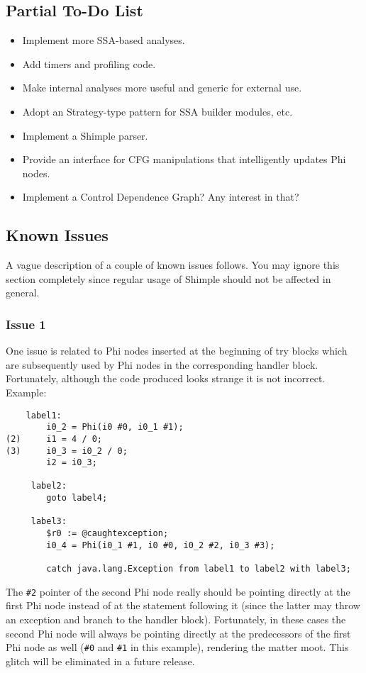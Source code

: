 \documentclass[10pt,letterpaper,oneside,onecolumn]{article}
\begin{document}
\subsection{Partial To-Do List}

\begin{itemize}
\item Implement more SSA-based analyses.
\item Add timers and profiling code.
\item Make internal analyses more useful and generic for external use.
\item Adopt an Strategy-type pattern for SSA builder modules, etc.
\item Implement a Shimple parser.
\item Provide an interface for CFG manipulations that intelligently 
updates Phi nodes.
\item Implement a Control Dependence Graph?  Any interest in that?
\end{itemize}

\subsection{Known Issues}

A vague description of a couple of known issues follows.  You may
ignore this section completely since regular usage of Shimple should
not be affected in general.

\subsubsection{Issue 1}

One issue is related to Phi nodes inserted at the beginning of try
blocks which are subsequently used by Phi nodes in the corresponding
handler block.  Fortunately, although the code produced looks strange
it is not incorrect.  Example:

\begin{verbatim}
    label1:
        i0_2 = Phi(i0 #0, i0_1 #1);
(2)     i1 = 4 / 0;
(3)     i0_3 = i0_2 / 0;
        i2 = i0_3;

     label2:
        goto label4;

     label3:
        $r0 := @caughtexception;
        i0_4 = Phi(i0_1 #1, i0 #0, i0_2 #2, i0_3 #3);

        catch java.lang.Exception from label1 to label2 with label3;
\end{verbatim}

The {\tt \#2} pointer of the second Phi node really should be pointing
directly at the first Phi node instead of at the statement following
it (since the latter may throw an exception and branch to the handler
block).  Fortunately, in these cases the second Phi node will always
be pointing directly at the predecessors of the first Phi node as well
({\tt \#0} and {\tt \#1} in this example), rendering the matter moot.
This glitch will be eliminated in a future release.
\end{document}
